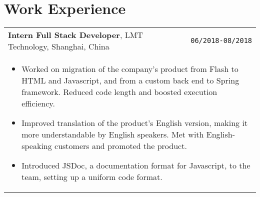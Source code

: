 \documentclass[10pt, letterpaper]{article}
\newcommand{\itemcols}[1]{
	\multicolumn{2}{p{\dimexpr \linewidth-2\tabcolsep}}{
	\begin{itemize}
		#1
	\end{itemize}
	}
}
\begin{document}
\section{Work Experience}
\smallskip
\noindent
\begin{tabularx}{\textwidth}{X r}
	\textbf{\large Intern Full Stack Developer}, LMT Technology, Shanghai, China & \texttt{06/2018-08/2018} \\
	\itemcols{
		\item Worked on migration of the company's product from Flash to HTML and Javascript, and from a custom back end to Spring framework. Reduced code length and boosted execution efficiency.
		\item Improved translation of the product's English version, making it more understandable by English speakers. Met with English-speaking customers and promoted the product. 
		\item Introduced JSDoc, a documentation format for Javascript, to the team, setting up a uniform code format.
	} 
\end{tabularx}
\end{document}
